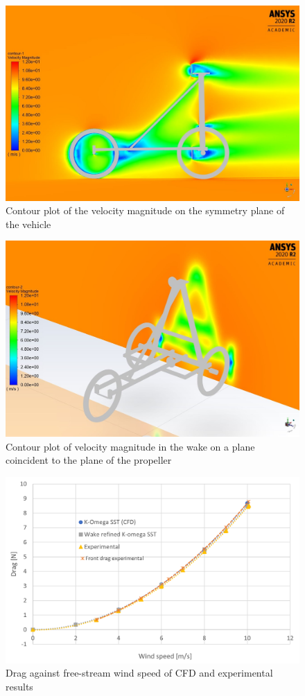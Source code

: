 \begin{figure}[!htbp]
    \centering
    \includegraphics[width=0.8\linewidth]{images/part10.1/vehiclesidevelocity.jpg}
    \caption{Contour plot of the velocity magnitude on the symmetry plane of the vehicle}
    \label{fig:vehiclesidevelo}
\end{figure}

\begin{figure}[!htbp]
    \centering
    \includegraphics[width=0.8\linewidth]{images/part10.1/vehicleisovelocity.jpg}
    \caption{Contour plot of velocity magnitude in the wake on a plane coincident to the plane of the propeller }
    \label{fig:vehicleisovelo}
\end{figure}

\begin{figure}[!htbp]
    \centering
    \includegraphics[width=0.75\linewidth]{images/part10.1/dragvalues.png}
    \caption{Drag against free-stream wind speed of CFD and experimental results}
    \label{fig:dragwind}
\end{figure}

